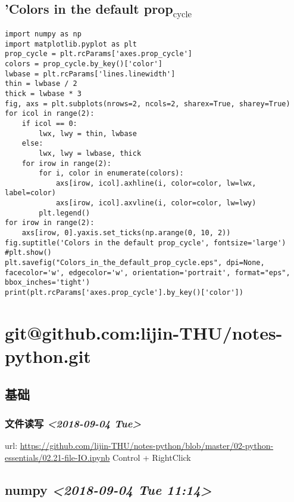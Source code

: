 \documentclass[11pt]{article}
\begin{document}
\subsection{'Colors in the default prop\(_{\text{cycle}}\)}
\label{sec:org1f81da4}
\begin{verbatim}
import numpy as np
import matplotlib.pyplot as plt
prop_cycle = plt.rcParams['axes.prop_cycle']
colors = prop_cycle.by_key()['color']
lwbase = plt.rcParams['lines.linewidth']
thin = lwbase / 2
thick = lwbase * 3
fig, axs = plt.subplots(nrows=2, ncols=2, sharex=True, sharey=True)
for icol in range(2):
    if icol == 0:
        lwx, lwy = thin, lwbase
    else:
        lwx, lwy = lwbase, thick
    for irow in range(2):
        for i, color in enumerate(colors):
            axs[irow, icol].axhline(i, color=color, lw=lwx, label=color)
            axs[irow, icol].axvline(i, color=color, lw=lwy)
        plt.legend()
for irow in range(2):
    axs[irow, 0].yaxis.set_ticks(np.arange(0, 10, 2))
fig.suptitle('Colors in the default prop_cycle', fontsize='large')
#plt.show()
plt.savefig("Colors_in_the_default_prop_cycle.eps", dpi=None, facecolor='w', edgecolor='w', orientation='portrait', format="eps", bbox_inches='tight')
print(plt.rcParams['axes.prop_cycle'].by_key()['color'])
\end{verbatim}
\section{git@github.com:lijin-THU/notes-python.git}
\label{sec:org52c2968}
\subsection{基础}
\label{sec:orgada0f66}
\subsubsection{文件读写 \textit{<2018-09-04 Tue>}}
\label{sec:org04a0079}
url: \url{https://github.com/lijin-THU/notes-python/blob/master/02-python-essentials/02.21-file-IO.ipynb}
Control + RightClick
\subsection{numpy \textit{<2018-09-04 Tue 11:14>}}
\label{sec:orgbc9721d}
\end{document}
